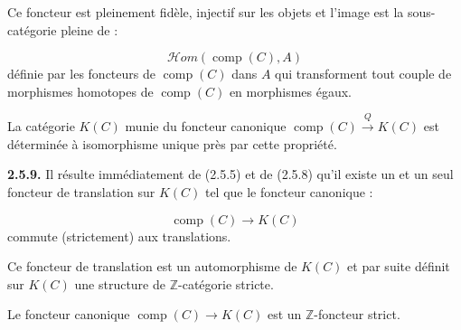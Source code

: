 Ce foncteur est pleinement fidèle, injectif sur les objets et l'image est la
sous-catégorie pleine de :

\begin{equation*}
  \mathcal H\!om(\operatorname{comp}(C),A)
\end{equation*}
définie par les foncteurs de $\operatorname{comp}(C)$ dans $A$ qui
transforment tout couple de morphismes homotopes de $\operatorname{comp}(C)$
en morphismes égaux.

La catégorie $K(C)$ munie du foncteur canonique
$\operatorname{comp}(C)\xrightarrow{Q}K(C)$ est déterminée à isomorphisme
unique près par cette propriété.

\noindent\textbf{2.5.9.}\quad
Il résulte immédiatement de (2.5.5) et de (2.5.8) qu'il existe un et un seul
foncteur de translation sur $K(C)$ tel que le foncteur canonique :

\begin{equation*}
  \operatorname{comp}(C)\longrightarrow K(C)
\end{equation*}
commute (strictement) aux translations.

Ce foncteur de translation est un automorphisme de $K(C)$ et par suite définit
sur $K(C)$ une structure de $\mathbb Z$-catégorie stricte.

Le foncteur canonique $\operatorname{comp}(C)\longrightarrow K(C)$ est un
$\mathbb Z$-foncteur strict.
